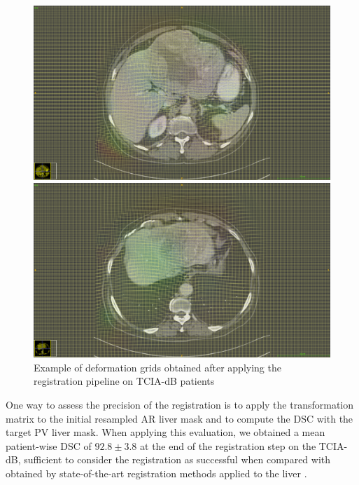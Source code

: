 \documentclass[]{article}
\newcommand{\lmttfont}[1]{{\fontfamily{lmtt}\selectfont #1}}
\begin{document}
\begin{figure}
\centering
\begin{minipage}{0.7\linewidth}
\includegraphics[width=\linewidth]{./images/TCIA_TCGA-DD-A11A_deformation_grid_slice49}
\end{minipage}

\vspace{0.8cm}
\begin{minipage}{0.7\linewidth}
\includegraphics[width=\linewidth]{./images/TCIA_TCGA-DD-A11A_deformation_grid_slice68}
\end{minipage}
\caption{Example of deformation grids obtained after applying the registration pipeline on \lmttfont{TCIA-dB} patients}
\label{fig:deformationGridExamples}
\end{figure}

One way to assess the precision of the registration is to apply the
transformation matrix to the initial resampled AR liver mask and to
compute the DSC with the target PV liver mask. When applying this
evaluation, we obtained a mean patient-wise DSC of $ 92.8 \pm 3.8 $ at the
end of the registration step on the \lmttfont{TCIA-dB}, sufficient to consider the
registration as successful when compared with obtained by state-of-the-art
registration methods applied to the liver \cite{Zhao2019}.
\end{document}
